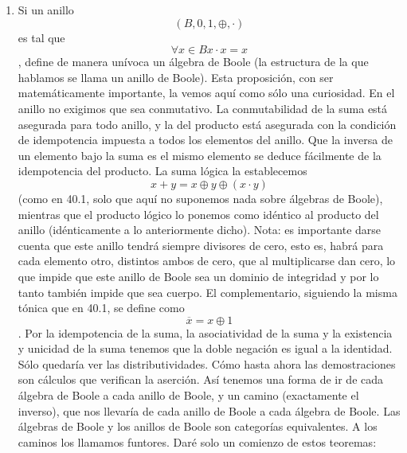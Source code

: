 \begin{enumerate}
\begin{enumerate}
\begin{enumerate}
\begin{enumerate}
        \[{= {{\lbrack{{({{({a + \overline{b}})} \cdot {({\overline{a} + b})}})} \cdot {({a \cdot b})}}\rbrack} + {\lbrack{{({{({\overline{a} \cdot b})} + {({a \cdot \overline{b}})}})} \cdot {({\overline{a} + \overline{b}})}}\rbrack}}} =\]

        \[{= {{\lbrack{({a + b})}\rbrack} \cdot {\lbrack{({{({\overline{a} + b})} \cdot {({a + \overline{b}})}})}\rbrack}}} =\]

        \[{= {{{({a + b})} \cdot {({\overline{a} + b})}} \cdot {({a + \overline{b}})}}} =\]

        \[{= {{\lbrack{{({a + b})} \cdot {({\overline{a} + b})}}\rbrack} \cdot {\lbrack{{({a + b})} \cdot {({a + \overline{b}})}}\rbrack}}} =\]

        \[{= {{\lbrack b\rbrack} \cdot {\lbrack a\rbrack}}} =\]

        \[= {a \cdot b}\]
      \end{enumerate}
    \item
      Si un anillo \[({B,0,1, \oplus , \cdot})\] es tal que
      \[\forall{x \in B}{{x \cdot x} = x}\], define de manera unívoca un
      álgebra de Boole (la estructura de la que hablamos se llama un
      anillo de Boole). Esta proposición, con ser matemáticamente
      importante, la vemos aquí como sólo una curiosidad. En el anillo
      no exigimos que sea conmutativo. La conmutabilidad de la suma está
      asegurada para todo anillo, y la del producto está asegurada con
      la con\-dición de idempotencia impuesta a todos los elementos del
      anillo. Que la inversa de un elemento bajo la suma es el mismo
      elemento se deduce fácilmente de la idempotencia del producto. La
      suma lógica la establecemos
      \[{{x + y} = x} \oplus y \oplus {({x \cdot y})}\](como en 40.1,
      solo que aquí no su\-ponemos nada sobre álgebras de Boole),
      mientras que el producto lógico lo pone\-mos como idéntico al
      producto del anillo (idénticamente a lo anteriormente dicho).
      Nota: es importante darse cuenta que este anillo tendrá siempre
      divisores de cero, esto es, habrá para cada elemento otro,
      distintos ambos de cero, que al multiplicarse dan cero, lo que
      impide que este anillo de Boole sea un dominio de integridad y por
      lo tanto también impide que sea cuerpo. El complementario,
      siguiendo la misma tó\-nica que en 40.1, se define como
      \[{\overline{x} = x} \oplus 1\]. Por la idempotencia de la suma,
      la asociatividad de la suma y la existencia y unicidad de la suma
      tenemos que la doble negación es igual a la identidad. Sólo
      quedaría ver las distributividades. Cómo hasta ahora las
      demostraciones son cálculos que verifican la aserción. Así tenemos
      una forma de ir de cada álgebra de Boole a cada anillo de Boole, y
      un camino (exacta\-mente el inverso), que nos llevaría de cada
      anillo de Boole a cada álgebra de Boole. Las álgebras de Boole y
      los anillos de Boole son categorías equivalentes. A los ca\-minos
      los llamamos funtores. Daré solo un comienzo de estos teoremas:


\end{enumerate}
\end{enumerate}
\end{enumerate}
